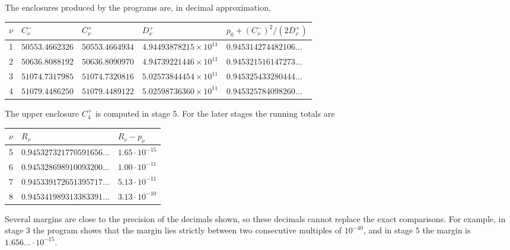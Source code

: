 \documentclass[11pt,colorlinks]{charlie}
\begin{document}
The enclosures produced by the programs are, in decimal approximation,
\begin{center}\small\setlength{\tabcolsep}{4pt}
\begin{tabular}{@{}cllll@{}}
\toprule
$\nu$&$C_\nu^-$&$C_\nu^+$&$D_\nu^+$&$p_0+(C_\nu^-)^2/(2D_\nu^+)$\\\midrule
1&$50553.4662326$&$50553.4664934$&$4.94493878215\times10^{11}$&$0.945314274482106\ldots$\\
2&$50636.8088192$&$50636.8090970$&$4.94739221446\times10^{11}$&$0.945321516147273\ldots$\\
3&$51074.7317985$&$51074.7320816$&$5.02573844454\times10^{11}$&$0.945325433280444\ldots$\\
4&$51079.4486250$&$51079.4489122$&$5.02598736360\times10^{11}$&$0.945325784098260\ldots$\\
\bottomrule
\end{tabular}
\end{center}
The upper enclosure $C_4^+$ is computed in stage $5$. For the later stages the running totals are
\begin{center}\small
\begin{tabular}{@{}cll@{}}
\toprule
$\nu$&$R_\nu$&$R_\nu-p_\nu$\\\midrule
5&$0.945327321770591656\ldots$&$1.65\cdot10^{-15}$\\
6&$0.945328698910093200\ldots$&$1.00\cdot10^{-11}$\\
7&$0.945339172651395717\ldots$&$5.13\cdot10^{-11}$\\
8&$0.945341989313383391\ldots$&$3.13\cdot10^{-10}$\\
\bottomrule
\end{tabular}
\end{center}
Several margins are close to the precision of the decimals shown, so these decimals cannot replace the exact comparisons. For example, in stage $3$ the program shows that the margin lies strictly between two consecutive multiples of $10^{-40}$, and in stage $5$ the margin is $1.656\ldots\cdot10^{-15}$.
\end{document}
